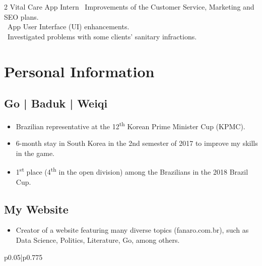 \documentclass[10pt]{article} %
\begin{document}
\begin{paracol}{2}
{}
{Vital Care App}
{Intern}
{\textrightarrow \ Improvements of the Customer Service, Marketing and SEO plans. \\ \textrightarrow \  App User Interface (UI) enhancements. \\ \textrightarrow \ Investigated problems with some clients’ sanitary infractions.}

\section{Personal Information}

    \subsection*{Go | Baduk | Weiqi}
    
        \begin{itemize}
        
            \itemsep0em
            \item Brazilian representative at the 12\textsuperscript{th} Korean Prime Minister Cup (KPMC).
            \item 6-month stay in South Korea in the 2nd semester of 2017 to improve my skills in the game.
            \item 1\textsuperscript{st} place (4\textsuperscript{th} in the open division) among the Brazilians in the 2018 Brazil Cup.
            
        \end{itemize}

    \subsection*{My Website}
    
        \begin{itemize}
        
            \itemsep0em
            \item Creator of a website featuring many diverse topics (fanaro.com.br), such as Data Science, Politics, Literature, Go, among others.
            
        \end{itemize}


\switchcolumn

\parbox[top][0.12\textheight][c]{\linewidth}{
	\vspace{-0.04\textheight}
	\colorbox{shade}{
		\begin{supertabular}{p{0.05\linewidth}|p{0.775\linewidth}}
		

\end{supertabular}}}
\end{paracol}
\end{document}
